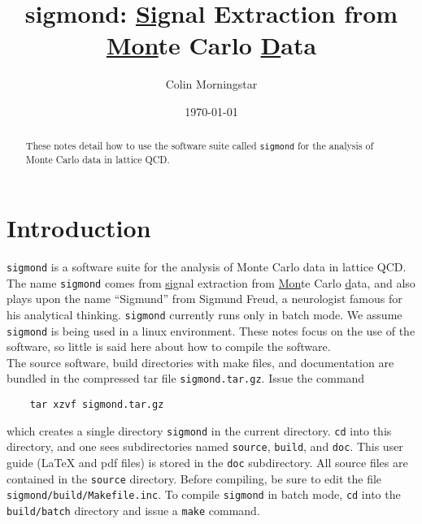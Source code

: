 \documentclass[12pt]{article}
\newcommand{\sigmond}{\texttt{sigmond} }
\newcommand{\vb}{\texttt}
\begin{document}
\title{\bf sigmond: \underline{Sig}nal Extraction from\\
  \underline{Mon}te Carlo
  \underline{D}ata}
\author{Colin Morningstar}
\date{\today}
\maketitle
\begin{abstract}
  These notes detail how to use the software suite called \sigmond for
  the analysis of Monte Carlo data in lattice QCD.
\end{abstract}

\newpage

\tableofcontents

\newpage

\section{Introduction}

\sigmond is a software suite for the analysis of Monte Carlo data in
lattice QCD.  The name \texttt{sigmond} comes from \underline{sig}nal
extraction from \underline{Mon}te Carlo \underline{d}ata, and also plays
upon the name ``Sigmund'' from Sigmund Freud, a neurologist famous for
his analytical thinking.
\sigmond currently runs only in batch mode.
We assume \sigmond is being used
in a linux environment.  These notes focus on the use of the software,
so little is said here about how to compile the software.\\

The source software, build directories with make files, and documentation
are bundled in the compressed tar file \vb{sigmond.tar.gz}.  Issue the
command
\begin{verbatim}
    tar xzvf sigmond.tar.gz
\end{verbatim}
which creates a single directory \vb{sigmond} in the current directory.
\vb{cd} into this directory, and one sees subdirectories named \vb{source},
\vb{build}, and \vb{doc}.  This user guide (LaTeX and pdf files)
is stored in the \vb{doc} subdirectory.  All source files are contained in
the \vb{source} directory.   Before compiling, be sure to edit the file
\vb{sigmond/build/Makefile.inc}.  To compile \vb{sigmond} in batch mode,
\vb{cd} into the \vb{build/batch} directory and
issue a \vb{make} command. \\
\end{document}

